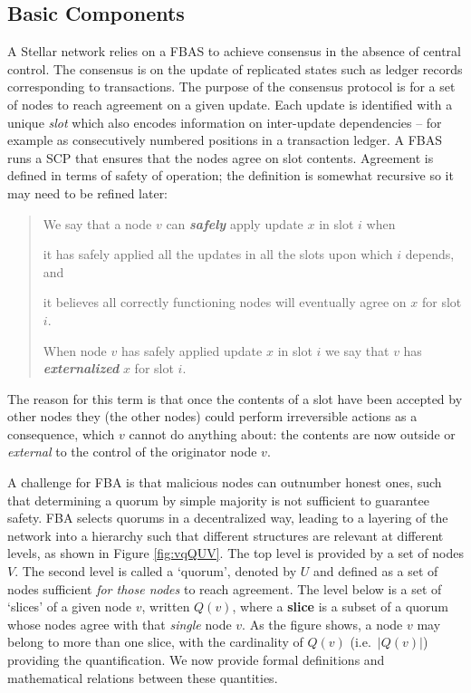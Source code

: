 \subsection{Basic Components}

A Stellar network relies on a FBAS to achieve consensus in the absence of central control. The consensus is on the update of replicated states such as ledger records corresponding to transactions. The purpose of the consensus protocol is for a set of nodes to reach agreement on a given update. Each update is identified with a unique \emph{slot} which also encodes information on inter-update dependencies -- for example as consecutively numbered positions in a transaction ledger. A FBAS runs a SCP that ensures that the nodes agree on slot contents. Agreement is defined in terms of safety of operation; the definition is somewhat recursive so it may need to be refined later:
\begin{quote}
\vspace{-0.8cm}
\small
\begin{defin}
We say that a node $v$ can \emph{\bf safely} apply update $x$ in slot $i$ when
\begin{packed_item1}
\item it has safely applied all the updates in all the slots upon which $i$ depends, and
\item it believes all correctly functioning nodes will eventually agree on $x$ for slot $i$.
\end{packed_item1}
\end{defin}
\smallskip
\begin{defin}
When node $v$ has safely applied update $x$ in slot $i$ we say that $v$ has \emph{\bf externalized} $x$ for slot $i$.
\end{defin}
\end{quote}
The reason for this term is that once the contents of a slot have been accepted by other nodes they (the other nodes) could perform irreversible actions as a consequence, which $v$ cannot do anything about: the contents are now outside or \emph{external} to the control of the originator node $v$.

A challenge for FBA is that malicious nodes can outnumber honest ones, such that determining a quorum by simple majority is not sufficient to guarantee safety. FBA selects quorums in a decentralized way, leading to a layering of the network into a hierarchy such that different structures are relevant at different levels, as shown in Figure \ref{fig:vqQUV}. The top level is provided by a set of nodes $V$. The second level is called a `quorum', denoted by $U$ and defined as a set of nodes sufficient \emph{for those nodes} to reach agreement. The level below is a set of `slices' of a given node $v$, written $Q(v)$, where a {\bf slice} is a subset of a quorum whose nodes agree with that \emph{single} node $v$. As the figure shows, a node $v$ may belong to more than one slice, with the cardinality of $Q(v)$ (i.e.\ $|Q(v)|$) providing the quantification. We now provide formal definitions and mathematical relations between these quantities.

